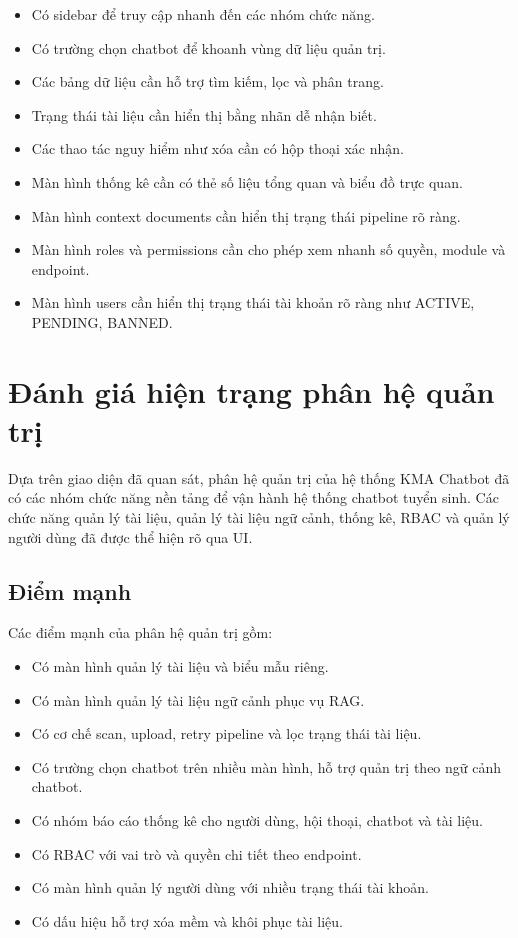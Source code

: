 \begin{itemize}
    \item Có sidebar để truy cập nhanh đến các nhóm chức năng.
    \item Có trường chọn chatbot để khoanh vùng dữ liệu quản trị.
    \item Các bảng dữ liệu cần hỗ trợ tìm kiếm, lọc và phân trang.
    \item Trạng thái tài liệu cần hiển thị bằng nhãn dễ nhận biết.
    \item Các thao tác nguy hiểm như xóa cần có hộp thoại xác nhận.
    \item Màn hình thống kê cần có thẻ số liệu tổng quan và biểu đồ trực quan.
    \item Màn hình context documents cần hiển thị trạng thái pipeline rõ ràng.
    \item Màn hình roles và permissions cần cho phép xem nhanh số quyền, module và endpoint.
    \item Màn hình users cần hiển thị trạng thái tài khoản rõ ràng như ACTIVE, PENDING, BANNED.
\end{itemize}

\section{Đánh giá hiện trạng phân hệ quản trị}

Dựa trên giao diện đã quan sát, phân hệ quản trị của hệ thống KMA Chatbot đã có các nhóm chức năng nền tảng để vận hành hệ thống chatbot tuyển sinh. Các chức năng quản lý tài liệu, quản lý tài liệu ngữ cảnh, thống kê, RBAC và quản lý người dùng đã được thể hiện rõ qua UI.

\subsection{Điểm mạnh}

Các điểm mạnh của phân hệ quản trị gồm:

\begin{itemize}
    \item Có màn hình quản lý tài liệu và biểu mẫu riêng.
    \item Có màn hình quản lý tài liệu ngữ cảnh phục vụ RAG.
    \item Có cơ chế scan, upload, retry pipeline và lọc trạng thái tài liệu.
    \item Có trường chọn chatbot trên nhiều màn hình, hỗ trợ quản trị theo ngữ cảnh chatbot.
    \item Có nhóm báo cáo thống kê cho người dùng, hội thoại, chatbot và tài liệu.
    \item Có RBAC với vai trò và quyền chi tiết theo endpoint.
    \item Có màn hình quản lý người dùng với nhiều trạng thái tài khoản.
    \item Có dấu hiệu hỗ trợ xóa mềm và khôi phục tài liệu.
\end{itemize}

